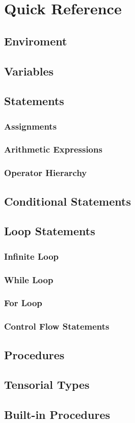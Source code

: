 
\chapter{Quick Reference}

\section{Enviroment}

\section{Variables}

\section{Statements}
\subsection{Assignments}
\subsection{Arithmetic Expressions}
\subsection{Operator Hierarchy}

\section{Conditional Statements}

\section{Loop Statements}
\subsection{Infinite Loop}
\subsection{While Loop}
\subsection{For Loop}
\subsection{Control Flow Statements}

\section{Procedures}

\section{Tensorial Types}

\section{Built-in Procedures}

